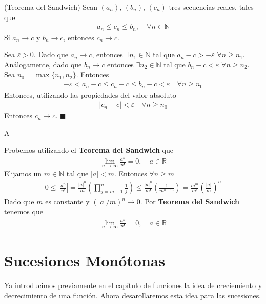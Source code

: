 \documentclass[12pt]{book}
\renewenvironment{proof}[1][\textit{Demostración}]{%
  \par\noindent{\bfseries #1.}\enspace}{\hfill$\blacksquare$\par}
\begin{document}
\begin{teo}{(Teorema del Sandwich)}{}
    Sean $(a_n)$, $(b_n)$, $(c_n)$ tres secuencias reales, tales que
    \begin{align*}
        a_n \leq c_n \leq b_n, \quad \forall n \in \mathbb{N}
    \end{align*}
    Si $a_n \to c$ y $b_n \to c$, entonces $c_n \to c$.
\end{teo}
\begin{proof}
    Sea $\varepsilon>0$. Dado que $a_n \to c$, entonces $\exists n_1 \in \mathbb{N}$ tal que $a_n-c>-\varepsilon$ $\forall n \geq n_1$. Análogamente, dado que $b_n \to c$ entonces $\exists n_2 \in \mathbb{N}$ tal que $b_n-c < \varepsilon$ $\forall n \geq n_2$. Sea $n_0=\max\{n_1,n_2\}$. Entonces
    \begin{align*}
       -\varepsilon<a_n-c \leq c_n - c \leq b_n -c < \varepsilon \quad \forall n \geq n_0 
    \end{align*}
    Entonces, utilizando las propiedades del valor absoluto
    \begin{align*}
        |c_n-c| < \varepsilon \quad \forall n \geq n_0
    \end{align*}
    Entonces $c_n \to c$.
\end{proof}
\begin{coro}{}{}
    A
\end{coro}
\begin{eje}{}{}
    Probemos utilizando el \textbf{Teorema del Sandwich} que 
    \begin{align*}
        \lim_{n \to \infty} \frac{a^n}{n!}=0, \quad a\in \mathbb{R}
    \end{align*}
    Elijamos un $m\in\mathbb{N}$ tal que $|a|< m$. Entonces $\forall n \geq m $
    \begin{align*}
        0\leq \left|\frac{a^n}{n!} \right|=\frac{|a|^n}{m}\left( \prod_{j={m+1}}^n\frac{1}{j}\right) \leq \frac{|a|^n}{m!}\left( \frac{1}{m^{n-m}}\right)= \frac{m^m}{m!}\left( \frac{|a|}{m}\right)^n
    \end{align*}
    Dado que $m$ es constante y $(|a|/m)^n \to 0$. Por \textbf{Teorema del Sandwich} tenemos que 
    \begin{align*}
        \lim_{n \to \infty} \frac{a^n}{n!}=0, \quad a\in \mathbb{R}
    \end{align*}
\end{eje}
\section{Sucesiones Monótonas}
Ya introducimos previamente en el capítulo de funciones la idea de creciemiento y decrecimiento de una función. Ahora desarollaremos esta idea para las sucesiones.
\end{document}
